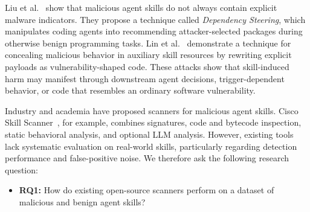 Liu et al.~\cite{liu2026trust} show that malicious agent skills do not always contain explicit malware indicators. They propose a technique called \textit{Dependency Steering}, which manipulates coding agents into recommending attacker-selected packages during otherwise benign programming tasks. Lin et al.~\cite{lin2026phantomskill} demonstrate a technique for concealing malicious behavior in auxiliary skill resources by rewriting explicit payloads as vulnerability-shaped code. These attacks show that skill-induced harm may manifest through downstream agent decisions, trigger-dependent behavior, or code that resembles an ordinary software vulnerability.




Industry and academia have proposed scanners for malicious agent skills. Cisco Skill
Scanner~\cite{cisco_skill_scanner}, for example, combines signatures, code and bytecode
inspection, static behavioral analysis, and optional LLM analysis. However, existing
tools lack systematic evaluation on real-world skills, particularly regarding detection
performance and false-positive noise. We therefore ask the following research question:
\begin{itemize}
    \item \textbf{RQ1:} How do existing open-source scanners perform on a dataset of malicious and benign agent skills?
\end{itemize}

